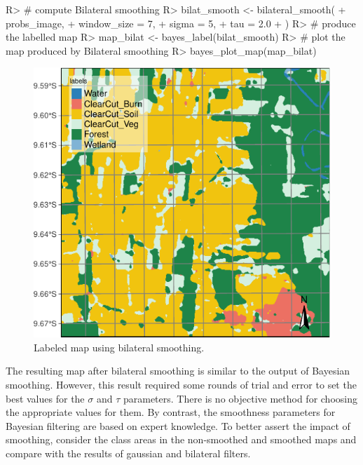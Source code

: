 \documentclass[
  shortnames]{jss}
\begin{document}
\begin{CodeChunk}
\begin{CodeInput}
R> # compute Bilateral smoothing
R> bilat_smooth <- bilateral_smooth(
+     probs_image,
+     window_size = 7,
+     sigma = 5,
+     tau = 2.0
+ )
R> # produce the labelled map
R> map_bilat <- bayes_label(bilat_smooth)
R> # plot the map produced by Bilateral smoothing
R> bayes_plot_map(map_bilat)
\end{CodeInput}
\begin{figure}[h]

{\centering \includegraphics{Bayesian_smoothing_JSS_files/figure-latex/bilat-1} 

}

\caption[Labeled map using bilateral smoothing]{Labeled map using bilateral smoothing.}\label{fig:bilat}
\end{figure}
\end{CodeChunk}

The resulting map after bilateral smoothing is similar to the output of Bayesian smoothing. However, this result required some rounds of trial and error to set the best values for the \(\sigma\) and \(\tau\) parameters. There is no objective method for choosing the appropriate values for them. By contrast, the smoothness parameters for Bayesian filtering are based on expert knowledge. To better assert the impact of smoothing, consider the class areas in the non-smoothed and smoothed maps and compare with the results of gaussian and bilateral filters.
\end{document}

